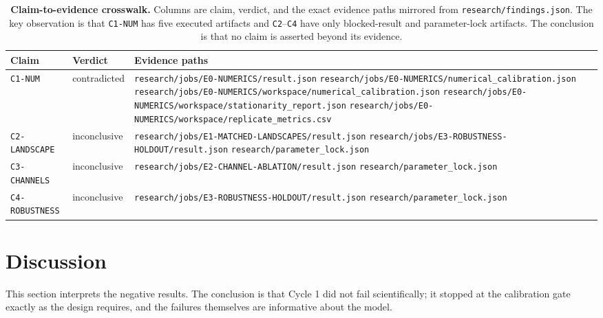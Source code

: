 \documentclass[11pt,a4paper]{article}
\newcommand{\code}[1]{\texttt{#1}}
\begin{document}
\begin{table}[htbp]
\centering
\small
\begin{tabular}{@{}llp{7.6cm}@{}}
\toprule
\textbf{Claim} & \textbf{Verdict} & \textbf{Evidence paths} \\
\midrule
\code{C1-NUM} & contradicted &
\code{research/jobs/E0-NUMERICS/result.json}\newline
\code{research/jobs/E0-NUMERICS/numerical\_calibration.json}\newline
\code{research/jobs/E0-NUMERICS/workspace/numerical\_calibration.json}\newline
\code{research/jobs/E0-NUMERICS/workspace/stationarity\_report.json}\newline
\code{research/jobs/E0-NUMERICS/workspace/replicate\_metrics.csv} \\
\code{C2-LANDSCAPE} & inconclusive &
\code{research/jobs/E1-MATCHED-LANDSCAPES/result.json}\newline
\code{research/jobs/E3-ROBUSTNESS-HOLDOUT/result.json}\newline
\code{research/parameter\_lock.json} \\
\code{C3-CHANNELS} & inconclusive &
\code{research/jobs/E2-CHANNEL-ABLATION/result.json}\newline
\code{research/parameter\_lock.json} \\
\code{C4-ROBUSTNESS} & inconclusive &
\code{research/jobs/E3-ROBUSTNESS-HOLDOUT/result.json}\newline
\code{research/parameter\_lock.json} \\
\bottomrule
\end{tabular}
\caption{\textbf{Claim-to-evidence crosswalk.} Columns are claim, verdict, and
the exact evidence paths mirrored from \code{research/findings.json}. The key
observation is that \code{C1-NUM} has five executed artifacts and
\code{C2}--\code{C4} have only blocked-result and parameter-lock artifacts. The
conclusion is that no claim is asserted beyond its evidence.}
\label{tab:crosswalk}
\end{table}

\section{Discussion}
\label{sec:discussion}

This section interprets the negative results. The conclusion is that Cycle 1
did not fail scientifically; it stopped at the calibration gate exactly as the
design requires, and the failures themselves are informative about the model.
\end{document}
